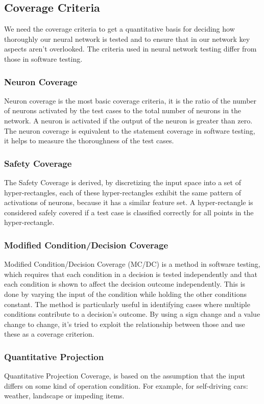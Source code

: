 \subsection*{Coverage Criteria}\label{subsec:coverage-criteria}
We need the coverage criteria to get a quantitative basis for deciding how thoroughly our neural network is tested and to ensure that in our network key aspects aren't overlooked.
The criteria used in neural network testing differ from those in software testing.

\subsubsection{Neuron Coverage}
Neuron coverage is the most basic coverage criteria, it is the ratio of the number of neurons activated by the test cases to the total number of neurons in the network.
A neuron is activated if the output of the neuron is greater than zero.
The neuron coverage is equivalent to the statement coverage in software testing, it helps to measure the thoroughness of the test cases.

\subsubsection{Safety Coverage}
The Safety Coverage is derived, by discretizing the input space into a set of hyper-rectangles, each of these hyper-rectangles exhibit the same pattern of activations of neurons, because it has a similar feature set.
A hyper-rectangle is considered safely covered if a test case is classified correctly for all points in the hyper-rectangle.
\subsubsection{Modified Condition/Decision Coverage}
Modified Condition/Decision Coverage (MC/DC) is a method in software testing, which requires that each condition in a decision is tested independently and that each condition is shown to affect the decision outcome independently.
This is done by varying the input of the condition while holding the other conditions constant.
The method is particularly useful in identifying cases where multiple conditions contribute to a decision's outcome.
By using a sign change and a value change to change, it's tried to exploit the relationship between those and use these as a coverage criterion.
\subsubsection{Quantitative Projection}
Quantitative Projection Coverage, is based on the assumption that the input differs on some kind of operation condition.
For example, for self-driving cars: weather, landscape or impeding items.

